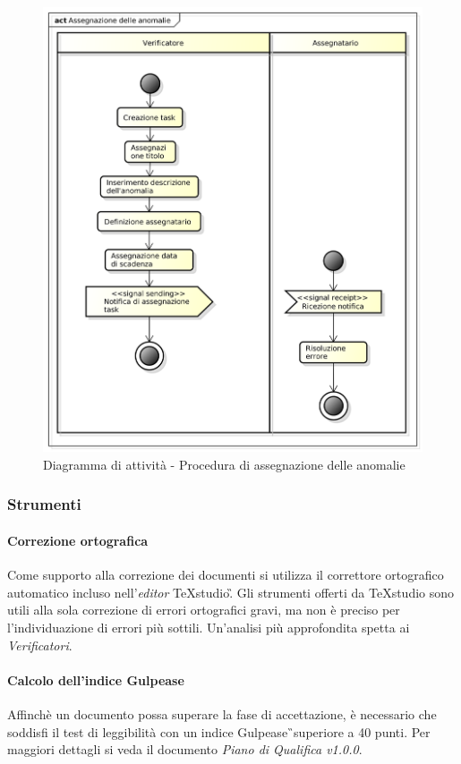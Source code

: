 \begin{figure}[htbp]
\centering
\includegraphics[scale=0.5]{immagini/assegnazione_anomalie.png}
\captionsetup{labelfont=bf}
\caption{Diagramma di attività - Procedura di assegnazione delle anomalie}\label{sec:Figura5}
\end{figure}

\subsubsection{Strumenti}
\paragraph{Correzione ortografica}
Come supporto alla correzione dei documenti si utilizza il correttore ortografico automatico incluso nell'\textit{editor} TeXstudio\G. Gli strumenti offerti da TeXstudio sono utili alla sola correzione di errori ortografici gravi, ma non è preciso per l'individuazione di errori più sottili. Un'analisi più approfondita spetta ai \textit{Verificatori}.
\paragraph{Calcolo dell'indice Gulpease}
Affinchè un documento possa superare la fase di accettazione, è necessario che soddisfi il test di leggibilità con un indice Gulpease\G\ superiore a 40 punti. Per maggiori dettagli si veda il documento \textit{Piano di Qualifica v1.0.0}.
\newpage